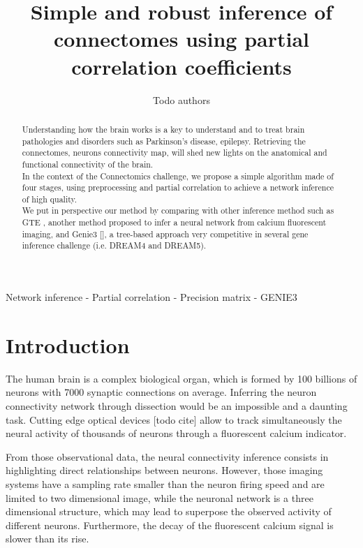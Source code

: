 \documentclass[wcp]{jmlr}
\title[Inference of connectomes using partial correlation coefficients]{Simple and robust inference of connectomes using partial correlation coefficients}
\author{Todo authors}
\begin{document}
\maketitle


\begin{abstract} Understanding how the brain works is a key to understand and
to treat brain pathologies and disorders such as Parkinson's disease,
epilepsy. Retrieving the connectomes, neurons connectivity map, will shed new
lights on the anatomical and functional connectivity of the brain.\\ In the
context of the Connectomics challenge, we propose a simple  algorithm made of
four stages, using preprocessing and partial correlation to achieve a network
inference of high quality.\\ We put in perspective our method by comparing
with other inference method such as GTE \cite{stetter2012model}, another
method proposed to infer a neural network from calcium fluorescent imaging,
and Genie3 [], a tree-based approach very competitive in several gene
inference challenge (i.e. DREAM4 and DREAM5).\\


\end{abstract}

\begin{keywords}
Network inference - Partial correlation - Precision matrix - GENIE3
\end{keywords}


\section{Introduction}\label{sec:intro}

The human brain is a complex biological organ, which is formed by 100
billions of neurons with 7000 synaptic connections on average. Inferring the
neuron connectivity network through dissection would be an impossible
and a daunting task. Cutting edge optical devices [todo cite] allow to track
simultaneously the neural activity of thousands of neurons through a fluorescent
calcium indicator.

From those observational data, the neural connectivity inference consists in
highlighting direct relationships between neurons. However, those imaging
systems have a sampling rate smaller than the neuron firing speed and are
limited to two dimensional image, while the neuronal network is a
three dimensional structure, which may lead to superpose the observed activity
of different neurons. Furthermore, the decay of the fluorescent calcium signal
is slower than its rise.
\end{document}
